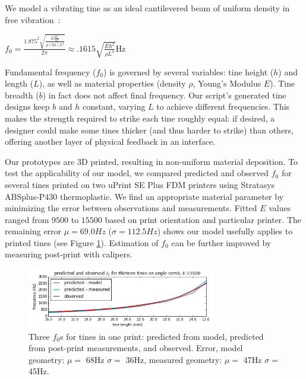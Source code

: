         We model a vibrating tine as an ideal cantilevered beam of uniform density in free vibration~\cite{meirovitch-analytical}: 

            \begin{center}
             $f_0 = \frac{1.875^2 \sqrt{\frac{E\frac{bh^3}{12}}{\rho (bh)L^4}}}{2\pi} \approx .1615 \sqrt{\frac{Eh^2}{\rho L^4}}$Hz
            \end{center}

            Fundamental frequency ($f_0$) is governed by several variables: tine height ($h$) and length ($L$), as well as material properties (density $\rho$, Young's Modulus $E$). Tine breadth ($b$) in fact does not affect final frequency. Our script's generated tine designs keep $b$ and $h$ constant, varying $L$ to achieve different frequencies. This makes the strength required to strike each tine roughly equal: if desired, a designer could make some tines thicker (and thus harder to strike) than others, offering another layer of physical feedback in an interface.

            Our prototypes are 3D printed, resulting in non-uniform material deposition. To test the applicability of our model, we compared predicted and observed $f_0$ for several tines printed on two uPrint SE Plus FDM printers using Stratasys ABSplus-P430 thermoplastic. We find an appropriate material parameter by minimizing the error between observations and measurements. Fitted $E$ values ranged from $9500$ to $15500$ based on print orientation and particular printer. The remaining error $\mu= 69.0Hz$ ($\sigma= 112.5Hz$) shows our model usefully applies to printed tines (see Figure \ref{fig:lamello-freqsgraph}). Estimation of $f_0$ can be further improved by measuring post-print with calipers.
            
            \begin{figure}[b]
 \centering
    \includegraphics[width=3.25in]{figures/lamello/meirovitch-small.png}
 \caption{Three $f_0$s for tines in one print: predicted from model, predicted from post-print measurements, and observed.  Error, model geometry: $\mu=$ 68Hz $\sigma=$ 36Hz, measured geometry: $\mu=$ 47Hz $\sigma=$ 45Hz.}
 \label{fig:lamello-freqsgraph}
\end{figure}


